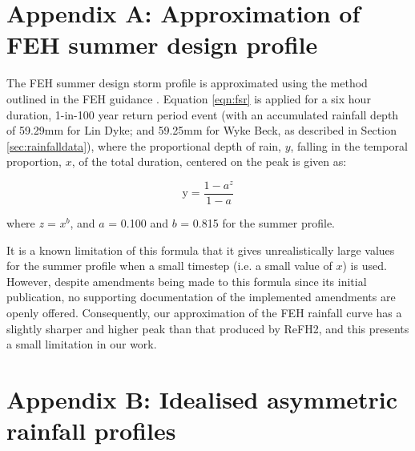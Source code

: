 \documentclass[APA,Times2COL]{WileyNJDv5}
\begin{document}

\section*{Appendix A: Approximation of FEH summer design profile}\label{sec:app_profiles}

The FEH summer design storm profile is approximated using the method outlined in the FEH guidance \citep{kjeldsen2007revitalised}. Equation \ref{eqn:fsr} is applied for a six hour duration, 1-in-100 year return period event (with an accumulated rainfall depth of 59.29mm for Lin Dyke; and 59.25mm for Wyke Beck, as described in Section \ref{sec:rainfalldata}), where the proportional depth of rain, $y$, falling in the temporal proportion, $x$, of the total duration, centered on the peak is given as:

\begin{equation}
\text{y} = \frac{1-a^{z}}{1-a}
 \label{eqn:fsr}
\end{equation}

where \textit{z} = $x^b$, and $a$ = 0.100 and $b$ = 0.815 for the summer profile. 

It is a known limitation of this formula that it gives unrealistically large values for the summer profile when a small timestep (i.e. a small value of $x$) is used. However, despite amendments being made to this formula since its initial publication, no supporting documentation of the implemented amendments are openly offered. Consequently, our approximation of the FEH rainfall curve has a slightly sharper and higher peak than that produced by ReFH2, and this presents a small limitation in our work. 

\section*{Appendix B: Idealised asymmetric rainfall profiles}\label{sec:app_profiles}
\end{document}

